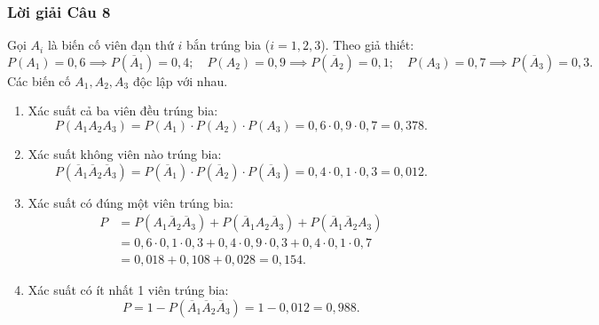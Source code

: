 \documentclass[12pt,a4paper]{article}
\theoremstyle{definition}
\begin{document}
\subsubsection*{Lời giải Câu 8}
Gọi $A_i$ là biến cố viên đạn thứ $i$ bắn trúng bia ($i = 1, 2, 3$).
Theo giả thiết:
\[
P(A_1) = 0{,}6 \implies P(\overline{A}_1) = 0{,}4; \quad
P(A_2) = 0{,}9 \implies P(\overline{A}_2) = 0{,}1; \quad
P(A_3) = 0{,}7 \implies P(\overline{A}_3) = 0{,}3.
\]
Các biến cố $A_1, A_2, A_3$ độc lập với nhau.
\begin{enumerate}[label=\alph*/]
    \item Xác suất cả ba viên đều trúng bia:
    \[
    P(A_1 A_2 A_3) = P(A_1) \cdot P(A_2) \cdot P(A_3) = 0{,}6 \cdot 0{,}9 \cdot 0{,}7 = 0{,}378.
    \]
    \item Xác suất không viên nào trúng bia:
    \[
    P(\overline{A}_1 \overline{A}_2 \overline{A}_3) = P(\overline{A}_1) \cdot P(\overline{A}_2) \cdot P(\overline{A}_3) = 0{,}4 \cdot 0{,}1 \cdot 0{,}3 = 0{,}012.
    \]
    \item Xác suất có đúng một viên trúng bia:
    \begin{align*}
    P &= P(A_1 \overline{A}_2 \overline{A}_3) + P(\overline{A}_1 A_2 \overline{A}_3) + P(\overline{A}_1 \overline{A}_2 A_3) \\
      &= 0{,}6 \cdot 0{,}1 \cdot 0{,}3 + 0{,}4 \cdot 0{,}9 \cdot 0{,}3 + 0{,}4 \cdot 0{,}1 \cdot 0{,}7 \\
      &= 0{,}018 + 0{,}108 + 0{,}028 = 0{,}154.
    \end{align*}
    \item Xác suất có ít nhất 1 viên trúng bia:
    \[
    P = 1 - P(\overline{A}_1 \overline{A}_2 \overline{A}_3) = 1 - 0{,}012 = 0{,}988.
    \]
\end{enumerate}
\end{document}
